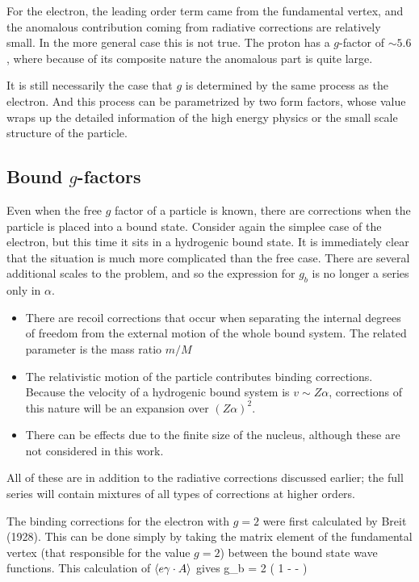 For the electron, the leading order term came from the fundamental vertex, and the anomalous contribution coming from radiative corrections are relatively small.  In the more general case this is not true.  The proton has a $g$-factor of $\sim 5.6$, where because of its composite nature the anomalous part is quite large.

It is still necessarily the case that $g$ is determined by the same process as the electron.  And this process can be parametrized by two form factors, whose value wraps up the detailed information of the high energy physics or the small scale structure of the particle. 

\subsection{Bound $g$-factors}

Even when the free $g$ factor of a particle is known, there are corrections when the particle is placed into a bound state.  Consider again the simplee case of the electron, but this time it sits in a hydrogenic bound state.  It is immediately clear that the situation is much more complicated than the free case.  There are several additional scales to the problem, and so the expression for $g_b$ is no longer a series only in $\alpha$.
\begin{itemize}
  \item 	There are recoil corrections that occur when separating the internal degrees of freedom from the external motion of the whole bound system.  The related parameter is the mass ratio $m/M$	%
  \item 	The relativistic motion of the particle contributes binding corrections.  Because the velocity of a hydrogenic bound system is $v \sim Z\alpha$, corrections of this nature will be an expansion over $(Z\alpha)^2$.
  \item		There can be effects due to the finite size of the nucleus, although these are not considered in this work.
\end{itemize}
All of these are in addition to the radiative corrections discussed earlier; the full series will contain mixtures of all types of corrections at higher orders.

The binding corrections for the electron with $g=2$ were first calculated by Breit (1928).  This can be done simply by taking the matrix element of the fundamental vertex (that responsible for the value $g=2$)  between the bound state wave functions.  This calculation of $\left<  e\gamma \cdot A \right>$ gives
\beq 
	g_b = 2 \left( 1 -  -  \right )
\eeq



